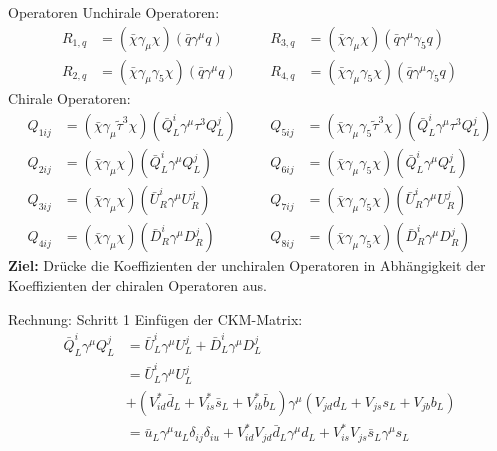 \begin{frame}{Operatoren}
Unchirale Operatoren:
\begin{align*}
	R_{1,q} &= (\bar{\chi}\gamma_\mu\chi)(\bar{q}\gamma^\mu q) && &R_{3,q} &= (\bar{\chi}\gamma_\mu\chi)(\bar{q}\gamma^\mu\gamma_5q) \\
	R_{2,q} &= (\bar{\chi}\gamma_\mu\gamma_5\chi)(\bar{q}\gamma^\mu q) &&	&R_{4,q} &= (\bar{\chi}\gamma_\mu\gamma_5\chi)(\bar{q}\gamma^\mu\gamma_5q)
\end{align*}
Chirale Operatoren:
\begin{align*}
	Q_{1ij} &= (\bar{\chi}\gamma_\mu\tilde{\tau}^3\chi)(\bar{Q}_L^i\gamma^\mu \tau^3Q_L^j) && &Q_{5ij} &= (\bar{\chi}\gamma_\mu\gamma_5\tilde{\tau}^3\chi)(\bar{Q}_L^i\gamma^\mu \tau^3Q_L^j) \\
	Q_{2ij} &= (\bar{\chi}\gamma_\mu\chi)(\bar{Q}_L^i\gamma^\mu Q_L^j) && &Q_{6ij} &= (\bar{\chi}\gamma_\mu\gamma_5\chi)(\bar{Q}_L^i\gamma^\mu Q_L^j) \\
	Q_{3ij} &= (\bar{\chi}\gamma_\mu\chi)(\bar{U}_R^i\gamma^\mu U_R^j) && &Q_{7ij} &= (\bar{\chi}\gamma_\mu\gamma_5\chi)(\bar{U}_R^i\gamma^\mu U_R^j) \\
	Q_{4ij} &= (\bar{\chi}\gamma_\mu\chi)(\bar{D}_R^i\gamma^\mu D_R^j) && &Q_{8ij} &= (\bar{\chi}\gamma_\mu\gamma_5\chi)(\bar{D}_R^i\gamma^\mu D_R^j)
\end{align*}
\textbf{Ziel:} Drücke die Koeffizienten der unchiralen Operatoren in Abhängigkeit der Koeffizienten der chiralen Operatoren aus.
\end{frame}


\begin{frame}{Rechnung: Schritt 1}
Einfügen der CKM-Matrix:
\begin{align*}
	\bar{Q}_L^i\gamma^\mu Q_L^j &= \bar{U}_L^i\gamma^\mu U_L^j + \bar{D}_L^i\gamma^\mu D_L^j \\
	&= \bar{U}_L^i\gamma^\mu U_L^j \\
	&+ (V_{id}^*\bar{d}_L + V_{is}^*\bar{s}_L+V_{ib}^*\bar{b}_L)\gamma^\mu(V_{jd}d_L+V_{js}s_L+V_{jb}b_L) \\
	&= \bar{u}_L\gamma^\mu u_L\delta_{ij}\delta_{iu} + V_{id}^*V_{jd}\bar{d}_L\gamma^\mu d_L + V_{is}^*V_{js}\bar{s}_L\gamma^\mu s_L
\end{align*}
\end{frame}


